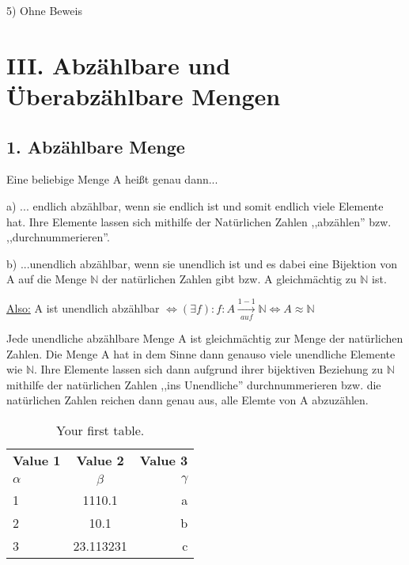 \documentclass[12pt]{article}
\begin{document}
		5) Ohne Beweis
		
		\section*{III. Abzählbare und Überabzählbare Mengen}
		
		\subsection*{1. Abzählbare Menge}
		
		Eine beliebige Menge A heißt genau dann...
		
		a) ... endlich abzählbar, wenn sie endlich ist und somit endlich viele Elemente hat. Ihre Elemente lassen
		   sich mithilfe  der Natürlichen Zahlen ,,abzählen'' bzw. ,,durchnummerieren''.
		
		b) ...unendlich abzählbar, wenn sie unendlich ist und es dabei eine Bijektion von A auf die Menge $\mathbb{N}$ der natürlichen Zahlen
		gibt bzw. A gleichmächtig zu $\mathbb{N}$ ist.
		
		\underline{Also:}
		A ist unendlich abzählbar $\Leftrightarrow (\exists f): f: A \xrightarrow[auf]{1-1} \mathbb{N} \Leftrightarrow A \approx \mathbb{N}$
		
		Jede unendliche abzählbare Menge A ist gleichmächtig zur Menge der natürlichen Zahlen. Die Menge A hat in dem Sinne dann genauso viele unendliche
		Elemente wie $\mathbb{N}$. Ihre Elemente lassen sich dann aufgrund ihrer bijektiven Beziehung zu $\mathbb{N}$ mithilfe der natürlichen Zahlen ,,ins Unendliche''
		durchnummerieren bzw. die natürlichen Zahlen reichen dann genau aus, alle Elemte von A abzuzählen.


	\begin{table}[h!]
	  \begin{center}
		\caption{Your first table.}
		\label{tab:table1}
		\begin{tabular}{l|c|r} %
		  \textbf{Value 1} & \textbf{Value 2} & \textbf{Value 3}\\
		  $\alpha$ & $\beta$ & $\gamma$ \\
		  \hline
		  1 & 1110.1 & a\\
		  2 & 10.1 & b\\
		  3 & 23.113231 & c\\
		\end{tabular}
	  \end{center}
	\end{table}
\end{document}
